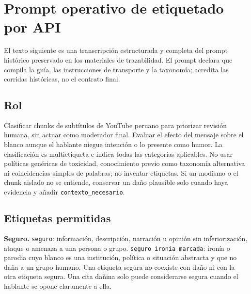 \section{Prompt operativo de etiquetado por API}
\label{app:prompt_operativo}

El texto siguiente es una transcripción estructurada y completa del prompt histórico preservado en los materiales de trazabilidad. El prompt declara que compila la guía, las instrucciones de transporte y la taxonomía; acredita las corridas históricas, no el contrato final.

\subsection*{Rol}

Clasificar chunks de subtítulos de YouTube peruano para priorizar revisión humana, sin actuar como moderador final. Evaluar el efecto del mensaje sobre el blanco aunque el hablante niegue intención o lo presente como humor. La clasificación es multietiqueta e indica todas las categorías aplicables. No usar políticas genéricas de toxicidad, conocimiento previo como taxonomía alternativa ni coincidencias simples de palabras; no inventar etiquetas. Si un modismo o el chunk aislado no se entiende, conservar un daño plausible solo cuando haya evidencia y añadir \texttt{contexto\_necesario}.

\subsection*{Etiquetas permitidas}

\textbf{Seguro.} \texttt{seguro}: información, descripción, narración u opinión sin inferiorización, ataque o amenaza a una persona o grupo. \texttt{seguro\_ironia\_marcada}: ironía o parodia cuyo blanco es una institución, política o situación abstracta y que no daña a un grupo humano. Una etiqueta segura no coexiste con daño ni con la otra etiqueta segura. Una cita dañina solo puede considerarse segura cuando el hablante se opone claramente a ella.

